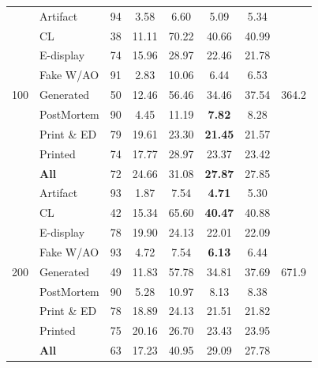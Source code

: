 \begin{table}[!htbp]
\begin{tabular}{l l c c c c c c}
\multirow{9}{*}{100}
& Artifact       & 94 &   3.58 &   6.60 &                 5.09 &    5.34 & \multirow{9}{*}{364.2} \\
& CL             & 38 &  11.11 &  70.22 &                40.66 &   40.99 &  \\
& E-display      & 74 &  15.96 &  28.97 &                22.46 &   21.78 &  \\
& Fake W/AO      & 91 &   2.83 &  10.06 &                 6.44 &    6.53 &  \\
& Generated      & 50 &  12.46 &  56.46 &                34.46 &   37.54 &  \\
& PostMortem     & 90 &   4.45 &  11.19 &        \textbf{7.82} &    8.28 &  \\
& Print \& ED    & 79 &  19.61 &  23.30 &       \textbf{21.45} &   21.57 &  \\
& Printed        & 74 &  17.77 &  28.97 &                23.37 &   23.42 &  \\
& \textbf{All}  & 72 &  24.66 &  31.08 &       \textbf{27.87} &   27.85 & \\
\midrule

\multirow{9}{*}{200}
& Artifact       & 93 &   1.87 &   7.54 &        \textbf{4.71} &    5.30 & \multirow{9}{*}{671.9} \\
& CL             & 42 &  15.34 &  65.60 &       \textbf{40.47} &   40.88 &  \\
& E-display      & 78 &  19.90 &  24.13 &                22.01 &   22.09 &  \\
& Fake W/AO      & 93 &   4.72 &   7.54 &        \textbf{6.13} &    6.44 &  \\
& Generated      & 49 &  11.83 &  57.78 &                34.81 &   37.69 &  \\
& PostMortem     & 90 &   5.28 &  10.97 &                 8.13 &    8.38 &  \\
& Print \& ED    & 78 &  18.89 &  24.13 &                21.51 &   21.82 &  \\
& Printed        & 75 &  20.16 &  26.70 &                23.43 &   23.95 &  \\
& \textbf{All}  & 63 &  17.23 &  40.95 &                29.09 &   27.78 & \\

\bottomrule
\end{tabular}
\end{table}